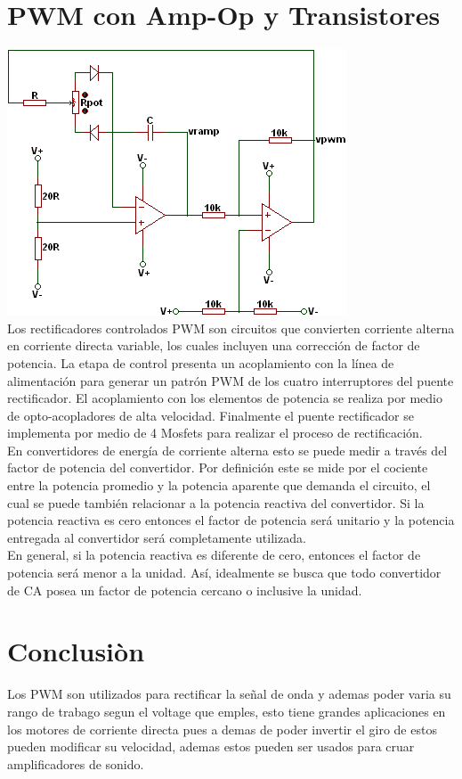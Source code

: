 \documentclass[12pt,a4paper]{report}
\begin{document}
\section{PWM con Amp-Op y Transistores}
\includegraphics[scale=1]{02.PNG}\\
Los rectificadores controlados PWM son circuitos que convierten corriente alterna en corriente directa variable, los cuales incluyen una corrección de factor de potencia. La etapa de control presenta un acoplamiento con la línea de alimentación para generar un patrón PWM de los cuatro interruptores del puente rectificador. El acoplamiento con los elementos de potencia se realiza por medio de opto-acopladores de alta velocidad. Finalmente el puente rectificador se implementa por medio de 4 Mosfets para realizar el proceso de rectificación.\\

En convertidores de energía de corriente alterna esto se puede medir a través del factor de potencia del convertidor. Por definición este se mide por el cociente entre la potencia
promedio y la potencia aparente que demanda el circuito, el cual se puede también relacionar a la potencia reactiva del convertidor. Si la potencia reactiva es cero entonces el factor de potencia será unitario y la potencia entregada al convertidor será completamente utilizada.\\ 
En general, si la potencia reactiva es diferente de cero, entonces el factor de potencia será menor a la unidad. Así, idealmente se busca que todo convertidor de CA posea un factor de potencia cercano o inclusive la unidad. 
\section{Conclusiòn }
Los PWM son utilizados para rectificar la señal de onda y ademas poder varia su rango de trabago segun el voltage que emples, esto tiene grandes aplicaciones en los motores de corriente directa pues a demas de poder invertir el giro de estos pueden modificar su velocidad, ademas estos pueden ser usados para cruar amplificadores de sonido.
\cite{Biblio}


 
\end{document}
